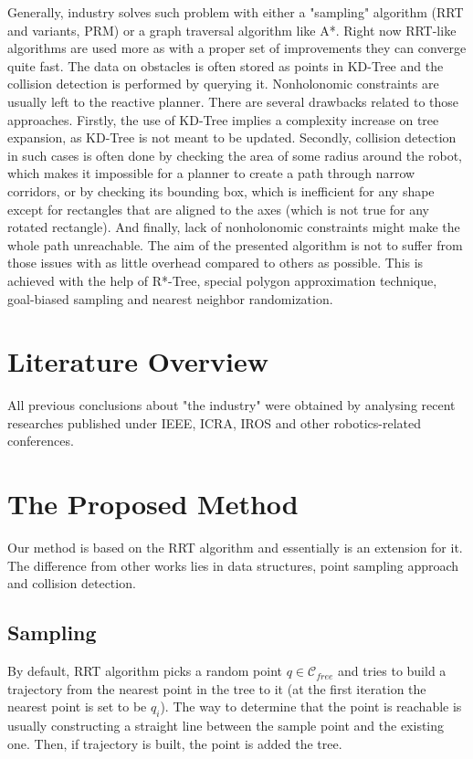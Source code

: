 \documentclass[a4paper,12pt]{article}
\DeclareRobustCommand{\[}{\begin{equation}}
\DeclareRobustCommand{\]}{\end{equation}}
\numberwithin{equation}{section}
\numberwithin{algorithm}{subsection}
\begin{document}
Generally, industry solves such problem with either a "sampling" algorithm (RRT and variants, PRM) or a graph traversal algorithm like A*. Right now RRT-like algorithms are used more as with a proper set of improvements they can converge quite fast. The data on obstacles is often stored as points in KD-Tree and the collision detection is performed by querying it. Nonholonomic constraints are usually left to the reactive planner. There are several
drawbacks related to those approaches. Firstly, the use of KD-Tree implies a complexity increase on tree expansion, as KD-Tree is not meant to be updated. Secondly, collision detection in such cases is often done by checking the area of some radius around the robot, which makes it impossible for a planner to create a path through narrow corridors, or by checking its bounding box, which is inefficient for any shape except for rectangles that are aligned to the axes (which is not true for any rotated rectangle). And finally, lack of nonholonomic constraints might make the whole path unreachable. The aim of the presented algorithm is not to suffer from those issues with as little overhead compared to others as possible.
This is achieved with the help of R*-Tree, special polygon approximation technique, goal-biased sampling and nearest neighbor randomization.

\section{Literature Overview}

All previous conclusions about "the industry" were obtained by analysing recent researches published under IEEE, ICRA, IROS and other robotics-related conferences.

\section{The Proposed Method}
Our method is based on the RRT algorithm and essentially is an extension for it. The difference from other works lies in data structures,
point sampling approach and collision detection.

\subsection{Sampling}

By default, RRT algorithm picks a random point $q\in\mathcal{C}_{free}$ and tries to build a trajectory from the nearest point in the tree to it (at the first iteration the
nearest point is set to be $q_i$).
The way to determine that the point is reachable is usually constructing a straight line between the sample point and the existing one.
Then, if trajectory is built, the point is added the tree.
\end{document}
